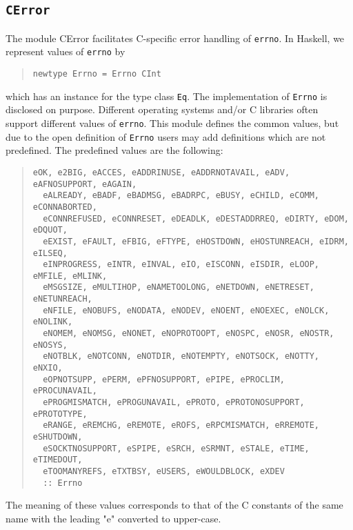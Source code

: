 \documentclass[a4paper,twoside]{article}
\newcommand{\code}[1]{\texttt{#1}}      %
\begin{document}
\subsection{\code{CError}}
\label{sec:CError}

The module CError facilitates C-specific error handling of \code{errno}.  In
Haskell, we represent values of \code{errno} by
%
\begin{quote}
\begin{verbatim}
newtype Errno = Errno CInt
\end{verbatim}
\end{quote}
%
which has an instance for the type class \code{Eq}.  The implementation of
\code{Errno} is disclosed on purpose.  Different operating systems and/or C
libraries often support different values of \code{errno}.  This module defines
the common values, but due to the open definition of \code{Errno} users may
add definitions which are not predefined.  The predefined values are the
following:
%
\begin{quote}
\begin{verbatim}
eOK, e2BIG, eACCES, eADDRINUSE, eADDRNOTAVAIL, eADV, eAFNOSUPPORT, eAGAIN, 
  eALREADY, eBADF, eBADMSG, eBADRPC, eBUSY, eCHILD, eCOMM, eCONNABORTED, 
  eCONNREFUSED, eCONNRESET, eDEADLK, eDESTADDRREQ, eDIRTY, eDOM, eDQUOT, 
  eEXIST, eFAULT, eFBIG, eFTYPE, eHOSTDOWN, eHOSTUNREACH, eIDRM, eILSEQ, 
  eINPROGRESS, eINTR, eINVAL, eIO, eISCONN, eISDIR, eLOOP, eMFILE, eMLINK, 
  eMSGSIZE, eMULTIHOP, eNAMETOOLONG, eNETDOWN, eNETRESET, eNETUNREACH, 
  eNFILE, eNOBUFS, eNODATA, eNODEV, eNOENT, eNOEXEC, eNOLCK, eNOLINK, 
  eNOMEM, eNOMSG, eNONET, eNOPROTOOPT, eNOSPC, eNOSR, eNOSTR, eNOSYS, 
  eNOTBLK, eNOTCONN, eNOTDIR, eNOTEMPTY, eNOTSOCK, eNOTTY, eNXIO, 
  eOPNOTSUPP, ePERM, ePFNOSUPPORT, ePIPE, ePROCLIM, ePROCUNAVAIL, 
  ePROGMISMATCH, ePROGUNAVAIL, ePROTO, ePROTONOSUPPORT, ePROTOTYPE, 
  eRANGE, eREMCHG, eREMOTE, eROFS, eRPCMISMATCH, eRREMOTE, eSHUTDOWN, 
  eSOCKTNOSUPPORT, eSPIPE, eSRCH, eSRMNT, eSTALE, eTIME, eTIMEDOUT, 
  eTOOMANYREFS, eTXTBSY, eUSERS, eWOULDBLOCK, eXDEV
  :: Errno
\end{verbatim}
\end{quote}
%
The meaning of these values corresponds to that of the C constants of the same
name with the leading "e" converted to upper-case.
\end{document}
